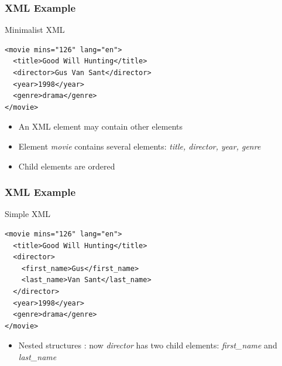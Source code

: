 \documentclass[svgnames]{beamer}
\begin{document}
\begin{frame}[fragile]
\frametitle{XML Example}

\begin{block}{Minimalist XML}
\begin{verbatim}
<movie mins="126" lang="en">
  <title>Good Will Hunting</title>
  <director>Gus Van Sant</director>
  <year>1998</year>
  <genre>drama</genre>
</movie>
\end{verbatim}
\end{block}

\bigskip

\begin{itemize}
 \item An XML element may contain other elements
 \item Element \textit{movie} contains several elements: \textit{title, director, year, genre}
 \item Child elements are ordered
\end{itemize}

\end{frame}


\begin{frame}[fragile]
\frametitle{XML Example}

\begin{block}{Simple XML}
\begin{verbatim}
<movie mins="126" lang="en">
  <title>Good Will Hunting</title>
  <director>
    <first_name>Gus</first_name>
    <last_name>Van Sant</last_name>
  </director>
  <year>1998</year>
  <genre>drama</genre>
</movie>
\end{verbatim}
\end{block}

\bigskip

\begin{itemize}
 \item Nested structures : now \textit{director} has two child elements: \textit{first\_name} and \textit{last\_name}
\end{itemize}

\end{frame}

\end{document}
